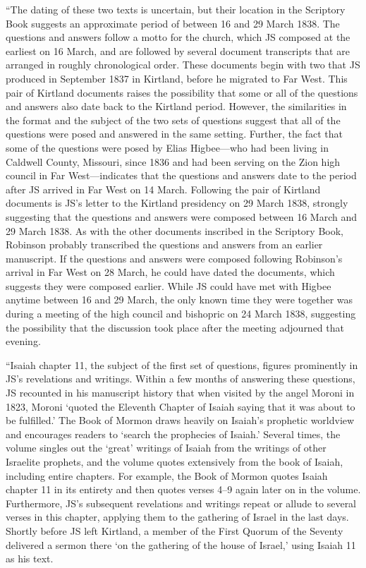 				``The dating of these two texts is uncertain, but their location in the Scriptory Book suggests an approximate period of between 16 and 29 March 1838. The questions and answers follow a motto for the church, which JS composed at the earliest on 16 March, and are followed by several document transcripts that are arranged in roughly chronological order. These documents begin with two that JS produced in September 1837 in Kirtland, before he migrated to Far West. This pair of Kirtland documents raises the possibility that some or all of the questions and answers also date back to the Kirtland period. However, the similarities in the format and the subject of the two sets of questions suggest that all of the questions were posed and answered in the same setting. Further, the fact that some of the questions were posed by Elias Higbee---who had been living in Caldwell County, Missouri, since 1836 and had been serving on the Zion high council in Far West---indicates that the questions and answers date to the period after JS arrived in Far West on 14 March. Following the pair of Kirtland documents is JS's letter to the Kirtland presidency on 29 March 1838, strongly suggesting that the questions and answers were composed between 16 March and 29 March 1838. As with the other documents inscribed in the Scriptory Book, Robinson probably transcribed the questions and answers from an earlier manuscript. If the questions and answers were composed following Robinson's arrival in Far West on 28 March, he could have dated the documents, which suggests they were composed earlier. While JS could have met with Higbee anytime between 16 and 29 March, the only known time they were together was during a meeting of the high council and bishopric on 24 March 1838, suggesting the possibility that the discussion took place after the meeting adjourned that evening.

				``Isaiah chapter 11, the subject of the first set of questions, figures prominently in JS's revelations and writings. Within a few months of answering these questions, JS recounted in his manuscript history that when visited by the angel Moroni in 1823, Moroni `quoted the Eleventh Chapter of Isaiah saying that it was about to be fulfilled.' The Book of Mormon draws heavily on Isaiah's prophetic worldview and encourages readers to `search the prophecies of Isaiah.' Several times, the volume singles out the `great' writings of Isaiah from the writings of other Israelite prophets, and the volume quotes extensively from the book of Isaiah, including entire chapters. For example, the Book of Mormon quotes Isaiah chapter 11 in its entirety and then quotes verses 4--9 again later on in the volume. Furthermore, JS's subsequent revelations and writings repeat or allude to several verses in this chapter, applying them to the gathering of Israel in the last days. Shortly before JS left Kirtland, a member of the First Quorum of the Seventy delivered a sermon there `on the gathering of the house of Israel,' using Isaiah 11 as his text.

